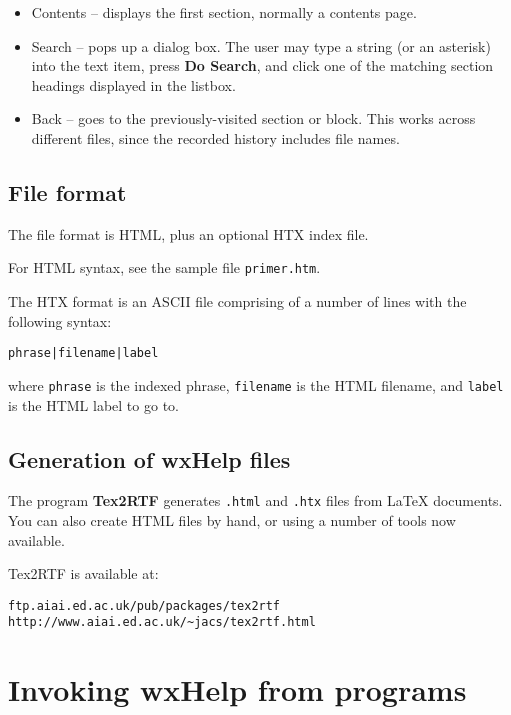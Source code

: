 \begin{itemize}\itemsep=0pt
\item Contents -- displays the first section, normally a contents page.
\item Search -- pops up a dialog box. The user may type a string (or an asterisk)
into the text item, press {\bf Do Search}, and click one of the
matching section headings displayed in the listbox.
\item Back -- goes to the previously-visited section or block. This works across
different files, since the recorded history includes file names.
\end{itemize}

\section{File format}

The file format is HTML, plus an optional HTX index file.

For HTML syntax, see the sample file {\tt primer.htm}.

The HTX format is an ASCII file comprising of a number of lines
with the following syntax:

\begin{verbatim}
phrase|filename|label
\end{verbatim}

where {\tt phrase} is the indexed phrase, {\tt filename} is the HTML filename, and {\tt label} is
the HTML label to go to.

\section{Generation of wxHelp files}

The program {\bf Tex2RTF} generates {\tt .html} and {\tt .htx} files from LaTeX
documents. You can also create HTML files by hand, or using a number of tools now
available.

Tex2RTF is available at:

\begin{verbatim}
ftp.aiai.ed.ac.uk/pub/packages/tex2rtf
http://www.aiai.ed.ac.uk/~jacs/tex2rtf.html
\end{verbatim}

\chapter{Invoking wxHelp from programs}
%
\setfooter{\thepage}{}{}{}{}{\thepage}

